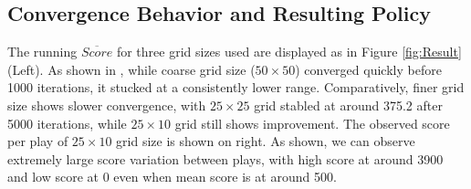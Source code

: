 \documentclass[11pt]{article}
\theoremstyle{definition}
\begin{document}
\subsection{\textbf{Convergence Behavior and Resulting Policy}}
The running $\overline{Score}$ for three grid sizes used are displayed as in Figure \ref{fig:Result}(Left). As shown in , while coarse grid size ($50 \times 50$) converged quickly before 1000 iterations, it stucked at a consistently lower range. Comparatively, finer grid size shows slower convergence, with $25 \times 25$ grid stabled at around 375.2 after 5000 iterations, while $25 \times 10$ grid still shows improvement. The observed score per play of $25 \times 10$ grid size is shown on right. As shown, we can observe extremely large score variation between plays, with high score at around 3900 and low score at 0 even when mean score is at around 500.
\end{document}
